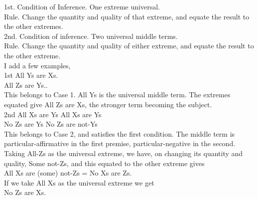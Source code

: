 \documentclass{article}
\begin{document}
{{{{1st. Condition of Inference. One extreme universal.\\
Rule. Change the quantity and quality of that extreme, and equate the
result to the other extremes.\vspace{.1in}\\
\hspace*{.2in} 
2nd. Condition of inference. Two universal middle terms.\\
Rule. Change the quantity and quality of either extreme, and equate the
result to the other extreme.\vspace{.1in}\\
\hspace*{.2in} 
I add a few examples,\\
\hspace*{.1in}1st All Ys are Xs.\\
\hspace*{.1in}All Zs are Ys..\vspace{.1in}\\
\hspace*{.2in} 
This belongs to Case 1. All Ys is the universal middle term. The extremes
equated give All Zs are Xs, the stronger term becoming the subject.\vspace{.1in}\\
\hspace*{.2in} 
2nd All Xs are Ys \hspace*{.3in} All Xs are Ys\\
\hspace*{.2in} No Zs are Ys \hspace*{.66in} No Zs are not-Ys\vspace{.1in}\\
\hspace*{.2in}
This belongs to Case 2, and satisfies the first condition. The middle term
is particular-affirmative in the first premise, particular-negative in the second.
Taking All-Zs as the universal extreme, we have, on changing its quantity and
quality, Some not-Zs, and this equated to the other extreme gives\vspace{.1in}\\
\hspace*{.2in}
All Xs are (some) not-Zs = No Xs are Zs.\vspace{.1in}\\
If we take All Xs as the universal extreme we get\vspace{.1in}\\
\hspace*{.2in}
No Zs are Xs.\vspace{.1in}\\
}}}}
\end{document}
